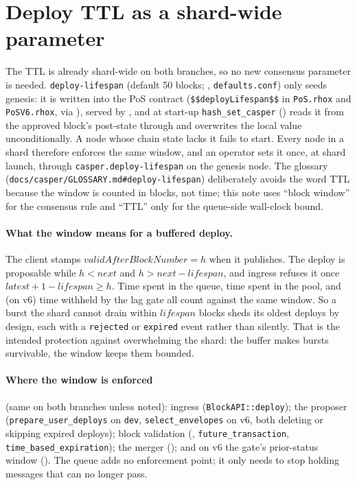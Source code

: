 \documentclass[11pt]{article}
\newcommand{\code}[1]{\texttt{#1}}
\newcommand{\dev}{\code{dev}}
\begin{document}
\section{Deploy TTL as a shard-wide parameter}
\label{sec:ttl}

The TTL is already shard-wide on both branches, so no new consensus parameter is
needed. \code{deploy-lifespan} (default 50 blocks; ,
\code{defaults.conf}) only seeds genesis: it is written into the PoS contract
(\code{\$\$deployLifespan\$\$} in \code{PoS.rhox} and \code{PoSV6.rhox}, via
), served by
, and at start-up \code{hash\_set\_casper}
() reads it from the approved block's post-state
through  and
overwrites the local value unconditionally. A node whose chain state lacks it fails to
start. Every node in a shard therefore enforces the same window, and an operator sets
it once, at shard launch, through \code{casper.deploy-lifespan} on the genesis node.
The glossary (\code{docs/casper/GLOSSARY.md\#deploy-lifespan}) deliberately avoids the
word TTL because the window is counted in blocks, not time; this note uses ``block
window'' for the consensus rule and ``TTL'' only for the queue-side wall-clock bound.

\paragraph{What the window means for a buffered deploy.} The client stamps
$\mathit{validAfterBlockNumber} = h$ when it publishes. The deploy is proposable while
$h < \mathit{next}$ and $h > \mathit{next} - \mathit{lifespan}$, and ingress refuses
it once $\mathit{latest} + 1 - \mathit{lifespan} \ge h$. Time spent in the queue, time
spent in the pool, and (on v6) time withheld by the lag gate all count against the
same window. So a burst the shard cannot drain within $\mathit{lifespan}$ blocks sheds
its oldest deploys by design, each with a \code{rejected} or \code{expired} event
rather than silently. That is the intended protection against overwhelming the shard:
the buffer makes bursts survivable, the window keeps them bounded.

\paragraph{Where the window is enforced} (same on both branches unless noted):
ingress (\code{BlockAPI::deploy}); the proposer (\code{prepare\_user\_deploys} on
\dev, \code{select\_envelopes} on v6, both deleting or skipping expired deploys);
block validation (,
\code{future\_transaction}, \code{time\_based\_expiration}); the merger
(); and on v6 the gate's
prior-status window (). The queue adds no enforcement point;
it only needs to stop holding messages that can no longer pass.
\end{document}
